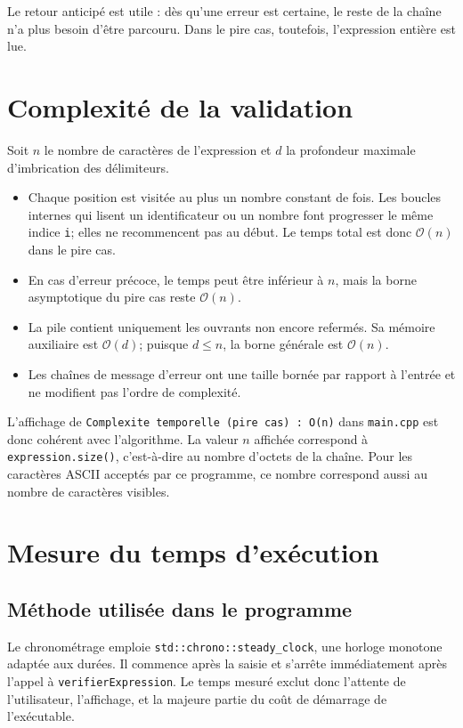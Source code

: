 \documentclass[11pt,a4paper]{article}
\newcommand{\fichier}[1]{\texttt{#1}}
\newcommand{\complexite}[1]{\ensuremath{\mathcal{O}(#1)}}
\begin{document}
Le retour anticipé est utile : dès qu'une erreur est certaine, le reste de la chaîne n'a plus besoin d'être parcouru. Dans le pire cas, toutefois, l'expression entière est lue.

\section{Complexité de la validation}

Soit $n$ le nombre de caractères de l'expression et $d$ la profondeur maximale d'imbrication des délimiteurs.

\begin{itemize}
  \item Chaque position est visitée au plus un nombre constant de fois. Les boucles internes qui lisent un identificateur ou un nombre font progresser le même indice \texttt{i}; elles ne recommencent pas au début. Le temps total est donc \complexite{n} dans le pire cas.
  \item En cas d'erreur précoce, le temps peut être inférieur à $n$, mais la borne asymptotique du pire cas reste \complexite{n}.
  \item La pile contient uniquement les ouvrants non encore refermés. Sa mémoire auxiliaire est \complexite{d}; puisque $d \leq n$, la borne générale est \complexite{n}.
  \item Les chaînes de message d'erreur ont une taille bornée par rapport à l'entrée et ne modifient pas l'ordre de complexité.
\end{itemize}

L'affichage de \texttt{Complexite temporelle (pire cas) : O(n)} dans \fichier{main.cpp} est donc cohérent avec l'algorithme. La valeur $n$ affichée correspond à \texttt{expression.size()}, c'est-à-dire au nombre d'octets de la chaîne. Pour les caractères ASCII acceptés par ce programme, ce nombre correspond aussi au nombre de caractères visibles.

\section{Mesure du temps d'exécution}

\subsection{Méthode utilisée dans le programme}

Le chronométrage emploie \texttt{std::chrono::steady\_clock}, une horloge monotone adaptée aux durées. Il commence après la saisie et s'arrête immédiatement après l'appel à \texttt{verifierExpression}. Le temps mesuré exclut donc l'attente de l'utilisateur, l'affichage, et la majeure partie du coût de démarrage de l'exécutable.
\end{document}
